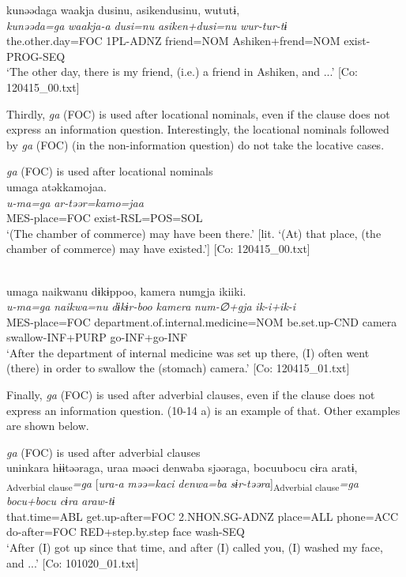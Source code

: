   \ex%
      \glll    kunəədaga  waakja  dusinu,  asikendusinu,                                     wututɨ,\\
      \textit{kunəəda=ga}  \textit{waakja-a}  \textit{dusi=nu}  \textit{asiken+dusi=nu}  \textit{wur-tur-tɨ}\\
      the.other.day=FOC  1PL-ADNZ  friend=NOM  Ashiken+frend=NOM                         exist-PROG-SEQ\\
      \glt       ‘The other day, there is my friend, (i.e.) a friend in Ashiken, and ...’ [Co: 120415\_00.txt]
    \z
\z

  Thirdly, \textit{ga} (FOC) is used after locational nominals, even if the clause does not express an information question. Interestingly, the locational nominals followed by \textit{ga} (FOC) (in the non-information question) do not take the locative cases.

\ea\label{ex:10.15}   \textit{ga} (FOC) is used after locational nominals\\
  \ea  %
      \glll    umaga  atəkkamojaa.\\
      \textit{u-ma=ga}  \textit{ar-təər=kamo=jaa}\\
      MES-place=FOC  exist-RSL=POS=SOL\\
      \glt       ‘(The chamber of commerce) may have been there.’ [lit. ‘(At) that place, (the chamber of commerce) may have existed.’] [Co: 120415\_00.txt]

  \ex\relax  [= (4-38 a)]\\
      \glll    umaga  naikwanu  dɨkɨppoo,   {\textbar}kamera{\textbar}  numgja  ikiiki.\\
      \textit{u-ma=ga}  \textit{naikwa=nu}  \textit{dɨkɨr-boo}    \textit{kamera}  \textit{num-∅+gja}  \textit{ik-i+ik-i}\\
      MES-place=FOC  department.of.internal.medicine=NOM  be.set.up-CND   camera  swallow-INF+PURP  go-INF+go-INF\\
      \glt       ‘After the department of internal medicine was set up there, (I) often went (there) in order to swallow the (stomach) camera.’ [Co: 120415\_01.txt]
    \z
\z

  Finally, \textit{ga} (FOC) is used after adverbial clauses, even if the clause does not express an information question. (10-14 a) is an example of that. Other examples are shown below.

\ea\label{ex:10.16}   \textit{ga} (FOC) is used after adverbial clauses\\
  \ea  %
      \glll    uninkara  hɨɨtəəraga,  uraa  məəci {\textbar}denwa{\textbar}ba  sjəəraga,  bocuubocu  cɨra  aratɨ,\\
      [\textit{unin=kara}  \textit{hɨɨr-təəra}]\textsubscript{Adverbial clause}\textit{=ga}  [\textit{ura-a}  \textit{məə=kaci}    \textit{denwa=ba}  \textit{sɨr-təəra}]\textsubscript{Adverbial clause}\textit{=ga}  \textit{bocu+bocu}  \textit{cɨra}  \textit{araw-tɨ}\\
      that.time=ABL  get.up-after=FOC  2.NHON.SG-ADNZ  place=ALL   phone=ACC  do-after=FOC  RED+step.by.step  face  wash-SEQ\\
      \glt       ‘After (I) got up since that time, and after (I) called you, (I) washed my face, and ...’ [Co: 101020\_01.txt]

